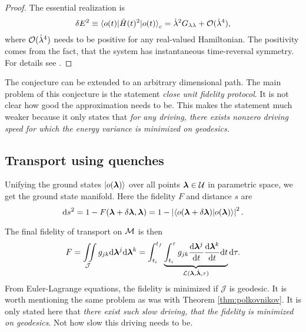 \begin{proof}
    The essential realization is
    \begin{equation}
        \delta E^2\equiv \braket{o(t)|\hat{H}(t)^2|o(t)}_c=\dot\lambda^2 G_{\lambda\lambda}+\mathcal{O}(\dot\lambda^4),
    \end{equation}
    where $\mathcal{O}(\dot\lambda^4)$ needs to be positive for any real-valued Hamiltonian. The positivity comes from the fact, that the system has instantaneous time-reversal symmetry. For details see \citet{Bukov2019}.
\end{proof}

The conjecture can be extended to an arbitrary dimensional path. The main problem of this conjecture is the statement \emph{close unit fidelity protocol}. It is not clear how good the approximation needs to be. This makes the statement much weaker because it only states that \emph{for any driving, there exists nonzero driving speed for which the energy variance is minimized on geodesics.}









\subsection{Transport using quenches}
\label{sec:quenches}
Unifying the ground states $\ket{o({\bm\lambda})}$ over all points ${\bm\lambda}\in\mathcal U$ in parametric space, we get the ground state manifold. Here the fidelity $F$ and distance $s$ are
\begin{equation}
    \mathrm{d} s^2 = 1-F({\bm\lambda}+\delta{\bm\lambda},{\bm\lambda}) = 1-\left|\braket{o(\bm{{\bm\lambda}}+\delta\bm{{\bm\lambda}})|o(\bm{{\bm\lambda}})}\right|^2.
    \label{eq:distanceOnM0_1}
\end{equation}

The final fidelity of transport on $\mathcal{M}$ is then
\begin{equation}
    F=\iint\limits_{\mathcal J} g_{jk}\mathrm{d}{\bm\lambda}^j\mathrm{d}{\bm\lambda}^k = \int_{t_i}^{t_f}\underbrace{\int_{t_i}^\tau g_{jk}\frac{\mathrm{d} {\bm\lambda}^j}{\mathrm{d} t}\frac{\mathrm{d} {\bm\lambda}^k}{\mathrm{d} t} \mathrm{d} t}_{\mathcal{L}({\bm\lambda},\dot{{\bm\lambda}},\tau)}\mathrm{d} \tau .
\end{equation}
From Euler-Lagrange equations, the fidelity is minimized if $\mathcal J$ is geodesic. It is worth mentioning the same problem as was with Theorem \ref{thm:polkovnikov}. It is only stated here that \emph{there exist such slow driving, that the fidelity is minimized on geodesics}. Not how slow this driving needs to be. 

